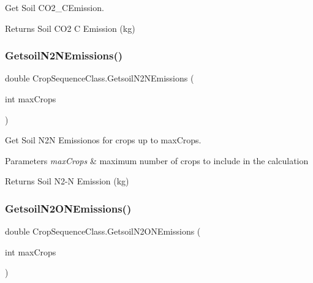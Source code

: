 Get Soil C\+O2\+\_\+\+C\+Emission. 

\begin{DoxyReturn}{Returns}
Soil C\+O2 C Emission (kg) 
\end{DoxyReturn}
\mbox{\label{class_crop_sequence_class_aad5858d480c48cb5675a96d8a5e95e80}} 
\subsubsection{\texorpdfstring{GetsoilN2NEmissions()}{GetsoilN2NEmissions()}}
{\footnotesize\ttfamily double Crop\+Sequence\+Class.\+Getsoil\+N2\+N\+Emissions (\begin{DoxyParamCaption}\item[{int}]{max\+Crops }\end{DoxyParamCaption})\hspace{0.3cm}{\ttfamily [inline]}}



Get Soil N2N Emissionos for crops up to max\+Crops. 


\begin{DoxyParams}{Parameters}
{\em max\+Crops} & maximum number of crops to include in the calculation \\
\hline
\end{DoxyParams}
\begin{DoxyReturn}{Returns}
Soil N2-\/N Emission (kg) 
\end{DoxyReturn}
\mbox{\label{class_crop_sequence_class_a61d3f67fda6f158732ab8379a6e25c5f}} 
\subsubsection{\texorpdfstring{GetsoilN2ONEmissions()}{GetsoilN2ONEmissions()}}
{\footnotesize\ttfamily double Crop\+Sequence\+Class.\+Getsoil\+N2\+O\+N\+Emissions (\begin{DoxyParamCaption}\item[{int}]{max\+Crops }\end{DoxyParamCaption})\hspace{0.3cm}{\ttfamily [inline]}}



